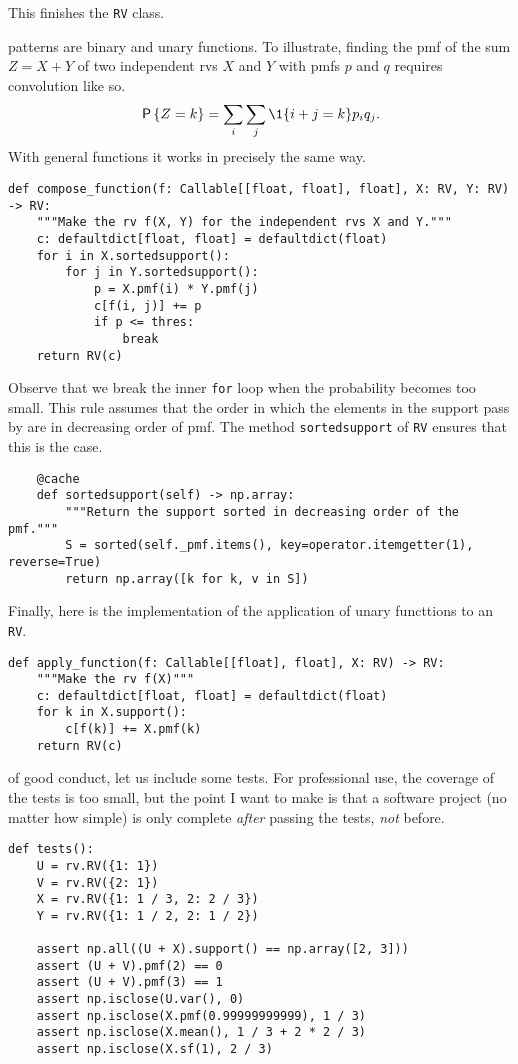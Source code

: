 \documentclass[stochastic-or]{subfiles}
\begin{document}
This finishes the \texttt{RV} class.

 patterns are binary and unary functions.
To illustrate, finding the pmf of the sum \(Z=X+Y\) of two independent rvs \(X\) and \(Y\) with pmfs \(p\) and \(q\) requires convolution like so.
\begin{equation*}
\P{Z=k} = \sum_{i}\sum_j \1{i+j=k} p_i q_{j}.
\end{equation*}
With general functions it works in precisely the same way.
\begin{verbatim}
def compose_function(f: Callable[[float, float], float], X: RV, Y: RV) -> RV:
    """Make the rv f(X, Y) for the independent rvs X and Y."""
    c: defaultdict[float, float] = defaultdict(float)
    for i in X.sortedsupport():
        for j in Y.sortedsupport():
            p = X.pmf(i) * Y.pmf(j)
            c[f(i, j)] += p
            if p <= thres:
                break
    return RV(c)
\end{verbatim}

Observe that we break the inner \texttt{for} loop when the probability becomes too small.
This rule assumes that the order in which the elements in the support pass by are in decreasing order of pmf.
The method \texttt{sortedsupport} of \texttt{RV} ensures that this is the case.

\begin{verbatim}
    @cache
    def sortedsupport(self) -> np.array:
        """Return the support sorted in decreasing order of the pmf."""
        S = sorted(self._pmf.items(), key=operator.itemgetter(1), reverse=True)
        return np.array([k for k, v in S])
\end{verbatim}

Finally, here is the implementation of the application of unary functtions to an \texttt{RV}.
\begin{verbatim}
def apply_function(f: Callable[[float], float], X: RV) -> RV:
    """Make the rv f(X)"""
    c: defaultdict[float, float] = defaultdict(float)
    for k in X.support():
        c[f(k)] += X.pmf(k)
    return RV(c)
\end{verbatim}

 of good conduct, let us include some tests.
For professional use, the coverage of the tests is too small, but the point I want to make is that a software project (no matter how simple) is only complete \emph{after}  passing the tests, \emph{not} before.
\begin{verbatim}
def tests():
    U = rv.RV({1: 1})
    V = rv.RV({2: 1})
    X = rv.RV({1: 1 / 3, 2: 2 / 3})
    Y = rv.RV({1: 1 / 2, 2: 1 / 2})

    assert np.all((U + X).support() == np.array([2, 3]))
    assert (U + V).pmf(2) == 0
    assert (U + V).pmf(3) == 1
    assert np.isclose(U.var(), 0)
    assert np.isclose(X.pmf(0.99999999999), 1 / 3)
    assert np.isclose(X.mean(), 1 / 3 + 2 * 2 / 3)
    assert np.isclose(X.sf(1), 2 / 3)
\end{verbatim}
\end{document}
